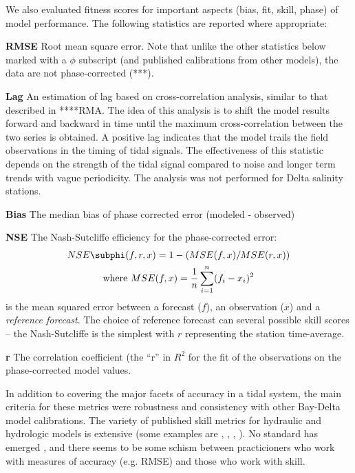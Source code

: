 We also evaluated fitness scores for important aspects (bias, fit, skill, phase) of 
model performance. The following statistics are reported where
appropriate:

\begin{description}
  \item{{\textbf{RMSE}}} Root mean square error. Note that unlike the other statistics 
	below marked with a $\phi$ subscript (and published calibrations from other models), 
	the data are not phase-corrected (***).
  \item{{\textbf{Lag}}} An estimation of lag based on cross-correlation analysis, 
	similar to that described in ****RMA. The idea of this analysis is to shift
	the model results forward and backward in time until the maximum cross-correlation 
	between the two series is obtained. A positive lag indicates that the model trails the
	field observations in the timing of tidal signals. The effectiveness
	of this statistic depends on the strength of the tidal signal compared to noise and longer term trends with vague     
	periodicity. The analysis was not performed for Delta salinity stations.
	\item{\textbf{Bias}\subphi} The median bias  of phase corrected error (modeled - observed)
	\item{\textbf{NSE}\subphi} The Nash-Sutcliffe efficiency for the phase-corrected error:
	\begin{gather}
	NSE\subphi(f,r,x) = 1 - (MSE(f,x)/MSE(r,x)) \\
	\text{where} ~ MSE(f,x) = \frac{1}{n} \sum\limits_{i=1}^{n}(f_i - x_i)^2 \\
	\end{gather} is the mean squared error between a forecast ($f$), an observation ($x$) 
	and a {\em reference forecast}. The choice of 
	reference forecast can several possible skill scores -- 
	the Nash-Sutcliffe is the simplest with $r$ representing the station time-average.
	\item{\textbf{r}\subphi} The correlation coefficient (the "`r"' in $R^2$ for the fit 
	of the observations on the phase-corrected model values.
\end{description}


In addition to covering the major facets of accuracy in a tidal
system, the main criteria for these metrics were robustness and consistency with
other Bay-Delta model calibrations. The variety of published skill metrics for hydraulic and hydrologic models is extensive 
(some examples are \citet{Willmott82,Willmott85,Willmott12}, \cite{Stow09}, \cite{Murphy88}, \cite{Ralston2006}). 
No standard has emerged \citep{Stowe09}, and there seems to be some schism between practicioners who work with 
measures of accuracy (e.g. RMSE) and those who work with skill. 

